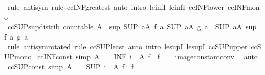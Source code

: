 \begin{isabellebody}
\ {\isacharparenleft}rule\ antisym{\isacharparenright}\ {\isacharparenleft}rule\ ccINF{\isacharunderscore}greatest{\isacharcomma}\ auto\ intro{\isacharcolon}\ le{\isacharunderscore}infI{}\ le{\isacharunderscore}infI{}\ ccINF{\isacharunderscore}lower\ ccINF{\isacharunderscore}mono{\isacharparenright}%
\endisatagproof
{\isafoldproof}%
%
\isadelimproof
\isanewline
%
\endisadelimproof
\isanewline
{}\isamarkupfalse%
\ ccSUP{\isacharunderscore}sup{\isacharunderscore}distrib{\isacharcolon}\ {\isachardoublequoteopen}countable\ A\ {\isasymLongrightarrow}\ sup\ {\isacharparenleft}SUP\ a{\isasymin}A{\isachardot}\ f\ a{\isacharparenright}\ {\isacharparenleft}SUP\ a{\isasymin}A{\isachardot}\ g\ a{\isacharparenright}\ {\isacharequal}\ {\isacharparenleft}SUP\ a{\isasymin}A{\isachardot}\ sup\ {\isacharparenleft}f\ a{\isacharparenright}\ {\isacharparenleft}g\ a{\isacharparenright}{\isacharparenright}{\isachardoublequoteclose}\isanewline
%
\isadelimproof
\ \ %
\endisadelimproof
%
\isatagproof
{}\isamarkupfalse%
\ {\isacharparenleft}rule\ antisym{\isacharbrackleft}rotated{\isacharbrackright}{\isacharparenright}\ {\isacharparenleft}rule\ ccSUP{\isacharunderscore}least{\isacharcomma}\ auto\ intro{\isacharcolon}\ le{\isacharunderscore}supI{}\ le{\isacharunderscore}supI{}\ ccSUP{\isacharunderscore}upper\ ccSUP{\isacharunderscore}mono{\isacharparenright}%
\endisatagproof
{\isafoldproof}%
%
\isadelimproof
\isanewline
%
\endisadelimproof
\isanewline
{}\isamarkupfalse%
\ ccINF{\isacharunderscore}const\ {\isacharbrackleft}simp{\isacharbrackright}{\isacharcolon}\ {\isachardoublequoteopen}A\ {\isasymnoteq}\ {\isacharbraceleft}{\isacharbraceright}\ {\isasymLongrightarrow}\ {\isacharparenleft}INF\ i\ {\isasymin}\ A{\isachardot}\ f{\isacharparenright}\ {\isacharequal}\ f{\isachardoublequoteclose}\isanewline
%
\isadelimproof
\ \ %
\endisadelimproof
%
\isatagproof
{}\isamarkupfalse%
\ image{\isacharunderscore}constant{\isacharunderscore}conv\ \isamarkupfalse%
\ auto%
\endisatagproof
{\isafoldproof}%
%
\isadelimproof
\isanewline
%
\endisadelimproof
\isanewline
{}\isamarkupfalse%
\ ccSUP{\isacharunderscore}const\ {\isacharbrackleft}simp{\isacharbrackright}{\isacharcolon}\ {\isachardoublequoteopen}A\ {\isasymnoteq}\ {\isacharbraceleft}{\isacharbraceright}\ {\isasymLongrightarrow}\ {\isacharparenleft}SUP\ i\ {\isasymin}\ A{\isachardot}\ f{\isacharparenright}\ {\isacharequal}\ f{\isachardoublequoteclose}\isanewline
%
\isadelimproof
\ \ %
\endisadelimproof

\end{isabellebody}
